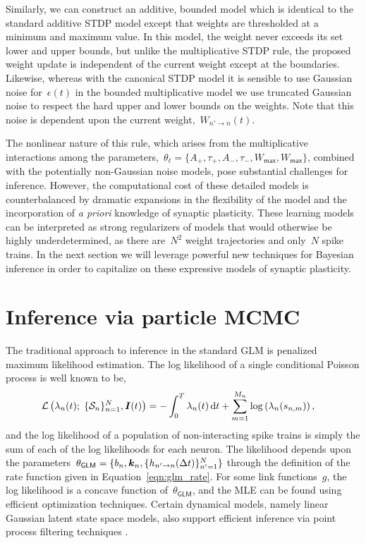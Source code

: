 Similarly, we can construct an additive, bounded model which is identical to the standard additive STDP model except that weights are thresholded at a minimum and maximum value. In this model, the weight never exceeds its set lower and upper bounds, but unlike the multiplicative STDP rule, the proposed weight update is independent of the current weight except at the boundaries. Likewise, whereas with the canonical STDP model it is sensible to use Gaussian noise for~$\epsilon(t)$
in the bounded multiplicative model we use truncated Gaussian noise to respect the hard upper and lower bounds on the weights.  Note that this noise is dependent upon the current weight,~$W_{n'\to n}(t)$.

The nonlinear nature of this rule, which arises from the multiplicative interactions among the parameters,~${\theta_\ell = \{A_+,\tau_+,A_-,\tau_-,W_{\mathsf{max}}, W_{\mathsf{max}}\}}$, combined with the potentially non-Gaussian noise models, pose substantial challenges for inference. However, the computational cost of these detailed models is counterbalanced by dramatic expansions in the flexibility of the model and the incorporation of \emph{a priori} knowledge of synaptic plasticity. These learning models can be interpreted as strong regularizers of models that would otherwise be highly underdetermined, as there are~$N^2$ weight trajectories and only~$N$ spike trains. In the next section we will leverage powerful new techniques for Bayesian inference in order to capitalize on these expressive models of synaptic plasticity.

\section{Inference via particle MCMC}
The traditional approach to inference in the standard GLM is penalized maximum likelihood estimation. The log likelihood of a single conditional Poisson process is well known to be,
\begin{align}
\label{eqn:glm_lkhd}
\mathcal{L}\left(\lambda_n(t);\;\{\mathcal{S}_n\}_{n=1}^N, \boldsymbol{I}(t)\right)
&= -\int_0^T \lambda_n(t)\,\mathrm{d} t + \sum_{m=1}^{M_n} \log\left(\lambda_n(s_{n,m})\right),
\end{align}
and the log likelihood of a population of non-interacting spike trains is simply the sum of each of the log likelihoods for each neuron. The likelihood depends upon the parameters~${\theta_{\mathsf{GLM}}=\{b_n,\boldsymbol{k}_n, \{h_{n'\to n}(\Delta t)\}_{n'=1}^N\}}$ through the definition of the rate function given in Equation~\ref{eqn:glm_rate}. For some link functions~$g$, the log likelihood is a concave function of~$\theta_{\mathsf{GLM}}$, and the MLE can be found using efficient optimization techniques. Certain dynamical models, namely linear Gaussian latent state space models, also support efficient inference via point process filtering techniques \cite{Smith-2003}.  

